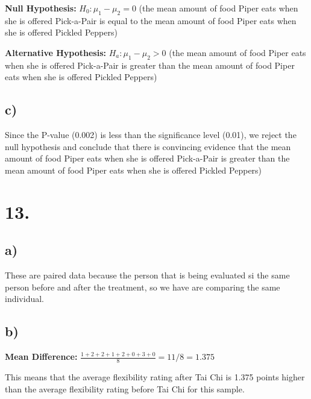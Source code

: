 \documentclass{article}
\begin{document}
\textbf{Null Hypothesis:} $H_0: \mu_1 - \mu_2 = 0$ (the mean amount of food Piper eats when she is offered Pick-a-Pair is equal to the mean amount of food Piper eats when she is offered Pickled Peppers)

\noindent\textbf{Alternative Hypothesis:} $H_a: \mu_1 - \mu_2 > 0$ (the mean amount of food Piper eats when she is offered Pick-a-Pair is greater than the mean amount of food Piper eats when she is offered Pickled Peppers)

\subsection*{c)}
Since the P-value (0.002) is less than the significance level (0.01), we reject the null hypothesis and
conclude that there is convincing evidence that the mean amount of food Piper eats when she is offered 
Pick-a-Pair is greater than the mean amount of food Piper eats when she is offered Pickled Peppers)

\section*{13.}


\subsection*{a)}
These are paired data because the person that is being evaluated si the same person before and after the treatment,
so we have are comparing the same individual.

\subsection*{b)}

\textbf{Mean Difference:} $\frac{1+2+2+1+2+0+3+0}{8} = 11/8 = 1.375$

This means that the average flexibility rating after Tai Chi is 1.375 points higher than the average flexibility 
rating before Tai Chi for this sample.
\end{document}
